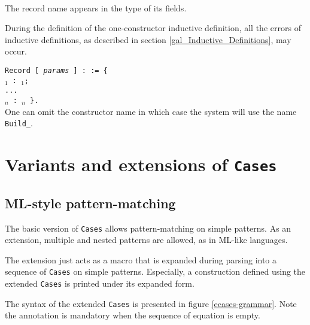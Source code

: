 \begin{ErrMsgs}
\item {}\\
  The record name {\ident} appears in the type of its fields.
      
  During the definition of the one-constructor inductive definition,
  all the errors of inductive definitions, as described in section
  \ref{gal_Inductive_Definitions}, may occur.
\end{ErrMsgs}

\begin{Variants}
\item 
\noindent
{\tt Record {\ident} [ {\rm\sl params} ] : {\sort} := \verb+{+ \\
\mbox{}\hspace{0.4cm}  {\ident$_1$} : {\term$_1$}; \\
\mbox{}\hspace{0.4cm}  ... \\
\mbox{}\hspace{0.4cm}  {\ident$_n$} : {\term$_n$} \verb+}+.}\\
 
One can omit the constructor name in which case the system will use
the name {\tt Build\_{\ident}}.
\end{Variants}

\section{Variants and extensions of {\tt Cases}}
\label{ExtensionsOfCases}

\subsection{ML-style pattern-matching}
\label{Mult-Cases}

The basic version of \verb+Cases+ allows pattern-matching on simple
patterns. As an extension, multiple and nested patterns are
allowed, as in ML-like languages.

The extension just acts as a macro that is expanded during parsing
into a sequence of {\tt Cases} on simple patterns. Especially, a
construction defined using the extended {\tt Cases} is printed under
its expanded form.

The syntax of the extended {\tt Cases} is presented in figure 
\ref{ecases-grammar}.
Note the annotation is mandatory when the sequence of equation is
empty.

